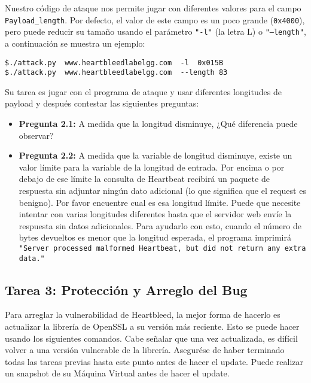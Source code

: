 Nuestro código de ataque nos permite jugar con diferentes valores para el campo \texttt{Payload\_length}. Por defecto, el valor de este campo es un poco grande (\texttt{0x4000}), pero puede reducir su tamaño usando el parámetro  \texttt{"-l"}  (la letra L) o \texttt{"--length"}, a continuación se muestra un ejemplo:

\begin{lstlisting}
$./attack.py  www.heartbleedlabelgg.com  -l  0x015B 
$./attack.py  www.heartbleedlabelgg.com	 --length 83
\end{lstlisting}
 
Su tarea es jugar con el programa de ataque y usar diferentes longitudes de payload y después contestar las siguientes preguntas:


\begin{itemize}
  \item {\bf Pregunta 2.1:} A medida que la longitud disminuye, ¿Qué diferencia puede observar?
  
  \item {\bf Pregunta 2.2:} A medida que la variable de longitud disminuye, existe un valor límite para la variable de la longitud de entrada. Por encima o por debajo de ese límite la consulta de Heartbeat recibirá un paquete de respuesta sin adjuntar ningún dato adicional (lo que significa que el request es benigno). Por favor encuentre cual es esa longitud límite. Puede que necesite intentar con varias longitudes diferentes hasta que el servidor web envíe la respuesta sin datos adicionales. Para ayudarlo con esto, cuando el número de bytes devueltos es menor que la longitud esperada, el programa imprimirá \texttt{"Server processed malformed Heartbeat, but did not return any extra data."}
\end{itemize}




\subsection{Tarea 3: Protección y Arreglo del Bug}

Para arreglar la vulnerabilidad de Heartbleed, la mejor forma de hacerlo es actualizar la librería de OpenSSL a su versión más reciente. Esto se puede hacer usando los siguientes comandos.
Cabe señalar que una vez actualizada, es difícil volver a una versión vulnerable de la librería. Asegurése de haber terminado todas las tareas previas hasta este punto antes de hacer el update. Puede realizar un snapshot de su Máquina Virtual antes de hacer el update.

